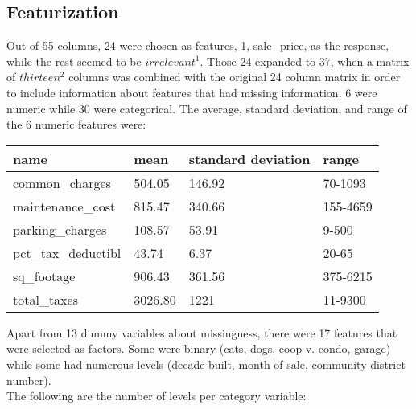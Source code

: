 \documentclass{article}
\begin{document}
\subsection{Featurization}
Out of 55 columns, 24 were chosen as features, 1, sale\_price, as the response, while the rest seemed to be $irrelevant^1$. Those 24 expanded to 37, when a matrix of $thirteen^2$ columns was combined with the original 24 column matrix in order to include information about features that had missing information. 6 were numeric while 30 were categorical. The average, standard deviation, and range of the 6 numeric features were: 
\begin{table}[htb]
\begin{tabular}{|l|l|l|l|}
\hline
name                & mean    & standard deviation & range    \\ \hline
common\_charges     & 504.05  & 146.92             & 70-1093  \\ \hline
maintenance\_cost   & 815.47  & 340.66             & 155-4659 \\ \hline
parking\_charges    & 108.57  & 53.91              & 9-500    \\ \hline
pct\_tax\_deductibl & 43.74   & 6.37               & 20-65    \\ \hline
sq\_footage         & 906.43  & 361.56             & 375-6215 \\ \hline
total\_taxes        & 3026.80 & 1221               & 11-9300  \\ \hline
\end{tabular}
\end{table}

Apart from 13 dummy variables about missingness, there were 17 features that were selected as factors. Some were binary (cats, dogs, coop v. condo, garage) while some had numerous levels (decade built, month of sale, community district number).\\
The following are the number of levels per category variable:\\
\end{document}
